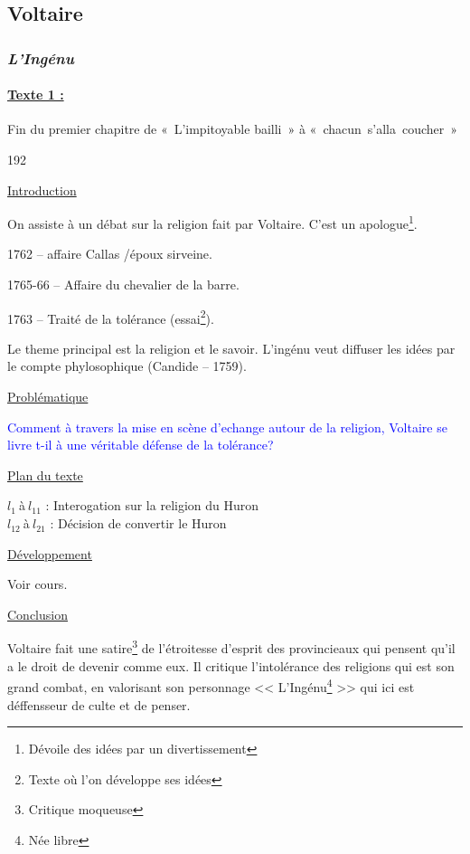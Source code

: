 \documentclass[12pt,a4paper]{article}
\begin{document}
			\subsection{Voltaire}
				\subsubsection[L'ing\'enu]{\textit{L'Ing\'enu}}
					\paragraph[Texte 1]{\textbf{\underline{Texte 1 :}}}
Fin du premier chapitre de «~L'impitoyable bailli~» \`a «~chacun~s'alla~coucher~»

\begin{dingautolist}{192}

\item \underline{Introduction} \par
	On assiste à un débat sur la religion fait par Voltaire. C'est un apologue\footnote{Dévoile des idées par un divertissement}.\par
1762 -- affaire Callas /époux sirveine.\par
1765-66 -- Affaire du chevalier de la barre.\par
1763 -- Traité de la tolérance (essai\footnote{Texte où l'on développe ses idées}).\par
Le theme principal est la religion et le savoir. L'ingénu veut diffuser les idées par le compte phylosophique (Candide -- 1759).

\item \underline{Probl\'ematique }\par
	\textcolor{blue}{Comment à travers la mise en scène d'echange autour de la religion, Voltaire se livre t-il à une véritable défense de la tolérance? }

\item \underline{Plan du texte} \par
	$l_{1}~$\`a$~l_{11}$ : Interogation sur la religion du Huron\\ 
	$l_{12}~$\`a$~l_{21}$ : Décision de convertir le Huron
\item \underline{D\'eveloppement} \par
        Voir cours.

\item \underline{Conclusion} \par
	Voltaire fait une satire\footnote{Critique moqueuse} de l'étroitesse d'esprit des provincieaux qui pensent qu'il a le droit de devenir comme eux. Il critique l'intolérance des religions qui est son grand combat, en valorisant son personnage << L'Ingénu\footnote{Née libre} >> qui ici est déffensseur de culte et de penser. 




\end{dingautolist}
 \newpage
\end{document}
